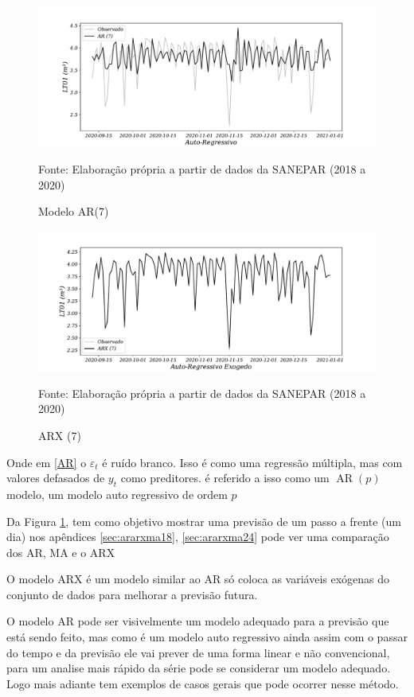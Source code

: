 \begin{figure}[H]
	\centering
	\caption{Modelo AR(7)  }
	\label{fig:1-ar}
	\includegraphics[width=1\linewidth]{Modelos/Figuras/1-AR}
	
	Fonte: Elaboração própria a partir de dados da SANEPAR (2018 a 2020)
\end{figure}

\begin{figure}[H]
	\centering
	\caption{ARX (7)  }
	\label{fig:1-arx}
	\includegraphics[width=1\linewidth]{Modelos/Figuras/1-ARX}
	
	Fonte: Elaboração própria a partir de dados da SANEPAR (2018 a 2020)
\end{figure}



Onde em \eqref{AR} o $\varepsilon_t$ é ruído branco. Isso é como uma regressão múltipla, mas com valores defasados de $y_t$ como preditores. é referido a isso como um $\operatorname{AR}(p)$ modelo, um modelo auto regressivo de ordem $p$

Da Figura \ref{fig:1-ar}, tem como objetivo mostrar uma previsão de um passo a frente (um dia) nos apêndices \ref{sec:ararxma18}, \ref{sec:ararxma24} pode ver uma comparação dos AR, MA e o ARX

O modelo ARX é um modelo similar ao AR só coloca as variáveis exógenas do conjunto de dados para melhorar a previsão futura.

O modelo AR pode ser visivelmente um modelo adequado para a previsão que está sendo feito, mas como é um modelo auto regressivo ainda assim com o passar do tempo e da previsão ele vai prever de uma forma linear e não convencional, para um analise mais rápido da série pode se considerar um modelo adequado. Logo mais adiante tem exemplos de casos gerais que pode ocorrer nesse método.

